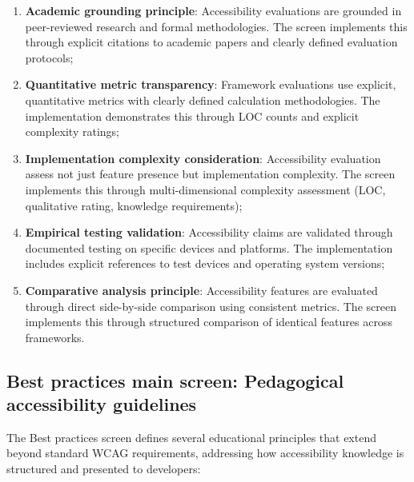 \begin{enumerate}
    \item \textbf{Academic grounding principle}: Accessibility evaluations are grounded in peer-reviewed research and formal methodologies. The screen implements this through explicit citations to academic papers and clearly defined evaluation protocols;
    
    \item \textbf{Quantitative metric transparency}: Framework evaluations use explicit, quantitative metrics with clearly defined calculation methodologies. The implementation demonstrates this through LOC counts and explicit complexity ratings;
    
    \item \textbf{Implementation complexity consideration}: Accessibility evaluation assess not just feature presence but implementation complexity. The screen implements this through multi-dimensional complexity assessment (LOC, qualitative rating, knowledge requirements);
    
    \item \textbf{Empirical testing validation}: Accessibility claims are validated through documented testing on specific devices and platforms. The implementation includes explicit references to test devices and operating system versions;
    
    \item \textbf{Comparative analysis principle}: Accessibility features are evaluated through direct side-by-side comparison using consistent metrics. The screen implements this through structured comparison of identical features across frameworks.
\end{enumerate}

\subsection{Best practices main screen: Pedagogical accessibility guidelines}

The Best practices screen defines several educational principles that extend beyond standard WCAG requirements, addressing how accessibility knowledge is structured and presented to developers:

